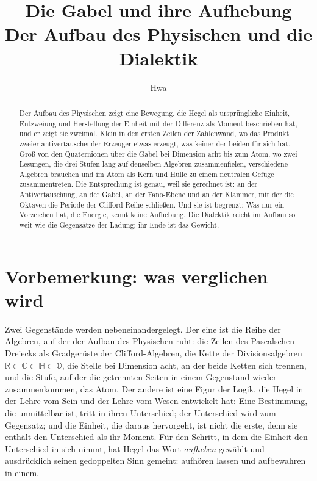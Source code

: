 \documentclass[11pt,a4paper]{article}
\title{Die Gabel und ihre Aufhebung\\[4pt]\large Der Aufbau des Physischen und die Dialektik}
\author{Hwa}
\date{}
\newcommand{\R}{\mathbb R}
\newcommand{\C}{\mathbb C}
\newcommand{\HH}{\mathbb H}
\newcommand{\Oc}{\mathbb O}
\begin{document}
\maketitle

\begin{abstract}
\noindent Der Aufbau des Physischen zeigt eine Bewegung, die Hegel als ursprüngliche Einheit, Entzweiung und Herstellung der Einheit mit der Differenz als Moment beschrieben hat, und er zeigt sie zweimal. Klein in den ersten Zeilen der Zahlenwand, wo das Produkt zweier antivertauschender Erzeuger etwas erzeugt, was keiner der beiden für sich hat. Groß von den Quaternionen über die Gabel bei Dimension acht bis zum Atom, wo zwei Lesungen, die drei Stufen lang auf denselben Algebren zusammenfielen, verschiedene Algebren brauchen und im Atom als Kern und Hülle zu einem neutralen Gefüge zusammentreten. Die Entsprechung ist genau, weil sie gerechnet ist: an der Antivertauschung, an der Gabel, an der Fano-Ebene und an der Klammer, mit der die Oktaven die Periode der Clifford-Reihe schließen. Und sie ist begrenzt: Was nur ein Vorzeichen hat, die Energie, kennt keine Aufhebung. Die Dialektik reicht im Aufbau so weit wie die Gegensätze der Ladung; ihr Ende ist das Gewicht.
\end{abstract}

\tableofcontents
\bigskip

\section*{Vorbemerkung: was verglichen wird}

Zwei Gegenstände werden nebeneinandergelegt. Der eine ist die Reihe der Algebren, auf der der Aufbau des Physischen ruht: die Zeilen des Pascalschen Dreiecks als Gradgerüste der Clifford-Algebren, die Kette der Divisionsalgebren $\R\subset\C\subset\HH\subset\Oc$, die Stelle bei Dimension acht, an der beide Ketten sich trennen, und die Stufe, auf der die getrennten Seiten in einem Gegenstand wieder zusammenkommen, das Atom. Der andere ist eine Figur der Logik, die Hegel in der Lehre vom Sein und der Lehre vom Wesen entwickelt hat: Eine Bestimmung, die unmittelbar ist, tritt in ihren Unterschied; der Unterschied wird zum Gegensatz; und die Einheit, die daraus hervorgeht, ist nicht die erste, denn sie enthält den Unterschied als ihr Moment. Für den Schritt, in dem die Einheit den Unterschied in sich nimmt, hat Hegel das Wort \emph{aufheben} gewählt und ausdrücklich seinen gedoppelten Sinn gemeint: aufhören lassen und aufbewahren in einem.
\end{document}
